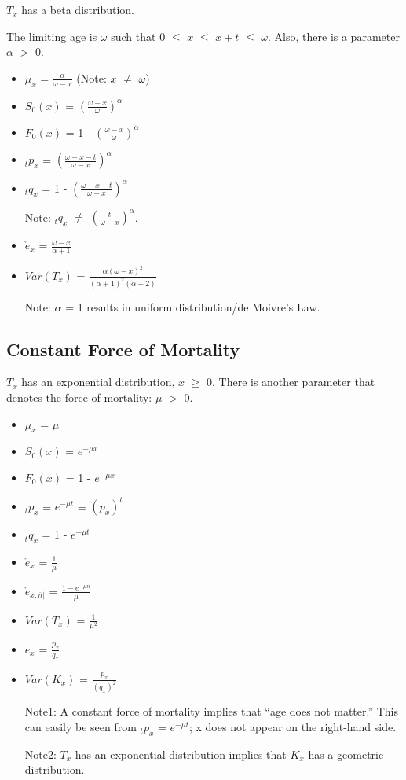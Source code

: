 \documentclass[]{book}
\begin{document}
\(T_x\) has a beta distribution.

The limiting age is \(\omega\) such that 0 \(\le\) \(x\) \(\le\)
\(x + t\) \(\le\) \(\omega\). Also, there is a parameter \(\alpha\)
\(>\) 0.

\begin{itemize}
\item
  \(\mu_x\) = \(\frac{\alpha}{\omega - x}\) (Note: \(x\) \(\neq\)
  \(\omega\))
\item
  \(S_0(x)\) = \(\left(\frac{\omega - x}{\omega}\right)^{\alpha}\)
\item
  \(F_0(x)\) = 1 - \(\left(\frac{\omega - x}{\omega}\right)^{\alpha}\)
\item
  \({}_{t}p_x\) =
  \(\left(\frac{\omega - x - t}{\omega - x}\right)^{\alpha}\)
\item
  \({}_{t}q_x\) = 1 -
  \(\left(\frac{\omega - x - t}{\omega - x}\right)^{\alpha}\)

  Note: \({}_{t}q_x\) \(\neq\)
  \(\left(\frac{t}{\omega - x}\right)^{\alpha}\).
\item
  \(\mathring{e}_x\) = \(\frac{\omega - x}{\alpha + 1}\)
\item
  \(Var(T_x)\) =
  \(\frac{\alpha(\omega - x)^2}{(\alpha + 1)^2(\alpha + 2)}\)

  Note: \(\alpha\) = 1 results in uniform distribution/de Moivre's Law.
\end{itemize}

\subsection{Constant Force of
Mortality}\label{constant-force-of-mortality}

\(T_x\) has an exponential distribution, \(x\) \(\ge\) 0. There is
another parameter that denotes the force of mortality: \(\mu\) \(>\) 0.

\begin{itemize}
\item
  \(\mu_x\) = \(\mu\)
\item
  \(S_0(x)\) = \(e^{-\mu x}\)
\item
  \(F_0(x)\) = 1 - \(e^{-\mu x}\)
\item
  \({}_{t}p_x\) = \(e^{-\mu t}\) = \((p_x)^t\)
\item
  \({}_{t}q_x\) = 1 - \(e^{-\mu t}\)
\item
  \(\mathring{e}_x\) = \(\frac{1}{\mu}\)
\item
  \(\mathring{e}_{x :\overline{n}|}\) = \(\frac{1 - e^{-\mu n}}{\mu}\)
\item
  \(Var(T_x)\) = \(\frac{1}{\mu^2}\)
\item
  \(e_x\) = \(\frac{p_x}{q_x}\)
\item
  \(Var(K_x)\) = \(\frac{p_x}{(q_x)^2}\)

  Note1: A constant force of mortality implies that ``age does not
  matter.'' This can easily be seen from \({}_{t}p_x\) = \(e^{-\mu t}\);
  x does not appear on the right-hand side.

  Note2: \(T_x\) has an exponential distribution implies that \(K_x\)
  has a geometric distribution.
\end{itemize}
\end{document}
